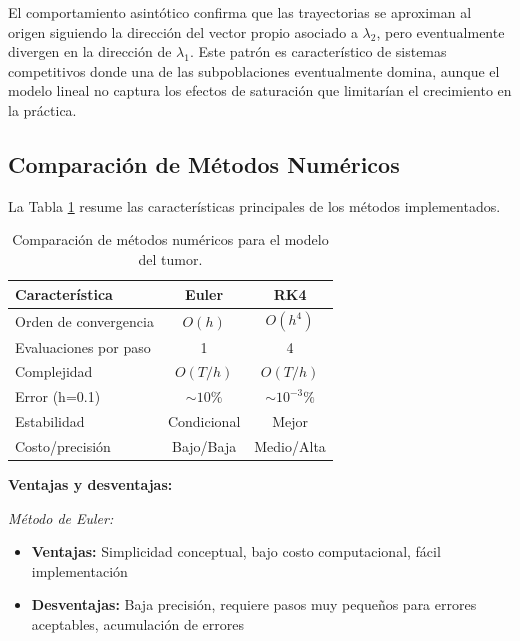 \documentclass[a4paper,10pt,twocolumn]{article}
\begin{document}
El comportamiento asintótico confirma que las trayectorias se aproximan al origen siguiendo la dirección del vector propio asociado a $\lambda_2$, pero eventualmente divergen en la dirección de $\lambda_1$. Este patrón es característico de sistemas competitivos donde una de las subpoblaciones eventualmente domina, aunque el modelo lineal no captura los efectos de saturación que limitarían el crecimiento en la práctica.

\subsection{Comparación de Métodos Numéricos}\label{subsec:comparacion-metodos}

La Tabla \ref{tab:comparacion-general} resume las características principales de los métodos implementados.

\begin{table}[H]
\centering
\scriptsize
\begin{tabular}{|l|c|c|}
\hline
\textbf{Característica} & \textbf{Euler} & \textbf{RK4} \\
\hline
Orden de convergencia & $O(h)$ & $O(h^4)$ \\
Evaluaciones por paso & 1 & 4 \\
Complejidad & $O(T/h)$ & $O(T/h)$ \\
Error (h=0.1) & $\sim 10\%$ & $\sim 10^{-3}\%$ \\
Estabilidad & Condicional & Mejor \\
Costo/precisión & Bajo/Baja & Medio/Alta \\
\hline
\end{tabular}
\caption{Comparación de métodos numéricos para el modelo del tumor.}
\label{tab:comparacion-general}
\end{table}

\textbf{Ventajas y desventajas:}

\textit{Método de Euler:}
\begin{itemize}
    \item \textbf{Ventajas:} Simplicidad conceptual, bajo costo computacional, fácil implementación
    \item \textbf{Desventajas:} Baja precisión, requiere pasos muy pequeños para errores aceptables, acumulación de errores
\end{itemize}
\end{document}
